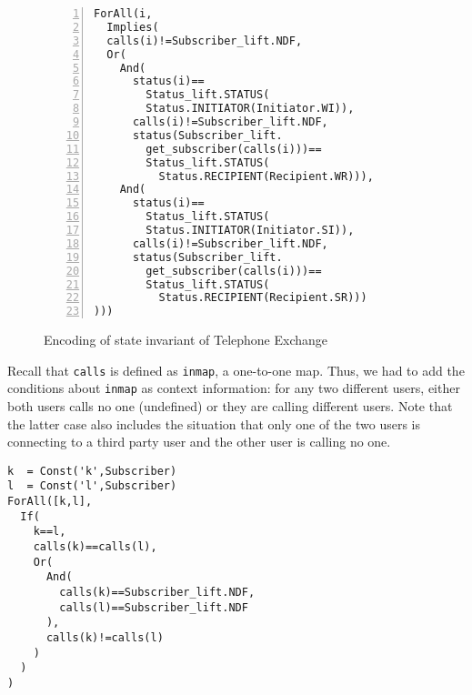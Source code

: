 
\begin{figure}[t]
\begin{center}
\begin{mdframed}[roundcorner=5pt,shadow=true]
\begin{Verbatim}[fontsize=\small,numbers=left]
ForAll(i,
  Implies(
  calls(i)!=Subscriber_lift.NDF,
  Or(
    And(
      status(i)==
        Status_lift.STATUS(
        Status.INITIATOR(Initiator.WI)),
	  calls(i)!=Subscriber_lift.NDF,
      status(Subscriber_lift.
        get_subscriber(calls(i)))==
        Status_lift.STATUS(
          Status.RECIPIENT(Recipient.WR))),
    And(
      status(i)==
        Status_lift.STATUS(
        Status.INITIATOR(Initiator.SI)),
      calls(i)!=Subscriber_lift.NDF,
      status(Subscriber_lift.
        get_subscriber(calls(i)))==
        Status_lift.STATUS(
          Status.RECIPIENT(Recipient.SR)))
)))
\end{Verbatim}
\end{mdframed}
\vspace{-10pt}
\caption{Encoding of state invariant of Telephone Exchange}
\label{fig:encode_state_inv_case2}
\end{center}
\end{figure}

Recall that {\tt calls} is defined as {\tt inmap}, a one-to-one map. Thus, we had to add  the conditions about {\tt inmap} as context information: for any two different users, either both users calls no one (undefined) or they are calling different users. Note that the latter case also includes the situation that only one of the two users is connecting to a third party user and the other user is calling no one.

\begin{mdframed}[roundcorner=5pt,shadow=true]
\begin{Verbatim}[fontsize=\small]
k  = Const('k',Subscriber)
l  = Const('l',Subscriber)
ForAll([k,l],
  If(
    k==l,
    calls(k)==calls(l),
    Or(
      And(
        calls(k)==Subscriber_lift.NDF,
        calls(l)==Subscriber_lift.NDF
      ),
      calls(k)!=calls(l)
    )
  )
)
\end{Verbatim}
\end{mdframed}

